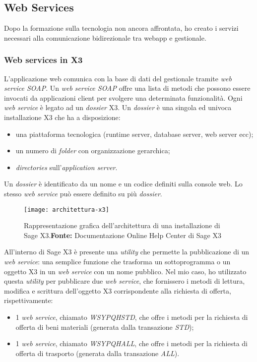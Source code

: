 
\subsection{Web Services}
Dopo la formazione sulla tecnologia non ancora affrontata, ho creato i servizi
necessari alla comunicazione bidirezionale tra webapp e gestionale.

\subsubsection{Web services in X3}
L'applicazione web comunica con la base di dati del gestionale tramite \textit{web service SOAP}.
Un \textit{web service SOAP} offre una lista di metodi che possono essere invocati da applicazioni client per svolgere una determinata funzionalità.
Ogni \textit{web service} è legato ad un \textit{dossier} X3. Un \textit{dossier} è una singola ed univoca installazione X3 che ha a disposizione:
\begin{itemize}
	\item una piattaforma tecnologica (runtime server, database server, web server ecc);
	\item un numero di \textit{folder} con organizzazione gerarchica;
	\item \textit{directories} sull'\textit{application server}.
\end{itemize}
Un \textit{dossier} è identificato da un nome e un codice definiti sulla console web.
Lo stesso \textit{web service} può essere definito su più \textit{dossier}.


\begin{figure}[htbp]
	\begin{center}
		\texttt{[image: architettura-x3]}
		\caption{Rappresentazione grafica dell'architettura di una installazione di Sage X3.\newline \textbf{Fonte:} Documentazione Online Help Center di Sage X3}
	\end{center}
\end{figure}




All'interno di Sage X3 è presente una \textit{utility} che permette la pubblicazione di un \textit{web service}: una semplice funzione che trasforma un sottoprogramma o un oggetto X3 in un \textit{web service} con un nome pubblico.
Nel mio caso, ho utilizzato questa \textit{utility} per pubblicare due \textit{web service}, che fornissero i metodi di lettura, modifica e scrittura dell'oggetto X3 corrispondente alla richiesta di offerta, rispettivamente:
\begin{itemize}
	\item 1 \textit{web service}, chiamato \textit{WSYPQHSTD}, che offre i metodi per la richiesta di offerta di beni materiali (generata dalla transazione \textit{STD}); 
	\item 1 \textit{web service}, chiamato \textit{WSYPQHALL}, che offre i metodi per la richiesta di offerta di trasporto (generata dalla transazione \textit{ALL}).
\end{itemize}


